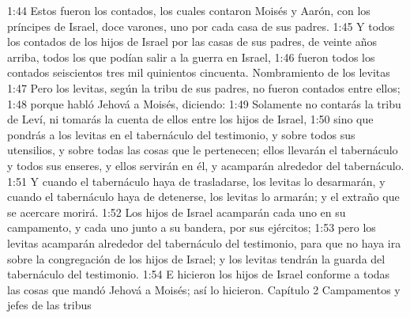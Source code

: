 1:44 Estos fueron los contados, los cuales contaron Moisés y Aarón, con los príncipes de Israel, doce varones, uno por cada casa de sus padres.  
1:45 Y todos los contados de los hijos de Israel por las casas de sus padres, de veinte años arriba, todos los que podían salir a la guerra en Israel,  
1:46 fueron todos los contados seiscientos tres mil quinientos cincuenta.  
Nombramiento de los levitas  
1:47 Pero los levitas, según la tribu de sus padres, no fueron contados entre ellos;  
1:48 porque habló Jehová a Moisés, diciendo:  
1:49 Solamente no contarás la tribu de Leví, ni tomarás la cuenta de ellos entre los hijos de Israel,  
1:50 sino que pondrás a los levitas en el tabernáculo del testimonio, y sobre todos sus utensilios, y sobre todas las cosas que le pertenecen; ellos llevarán el tabernáculo y todos sus enseres, y ellos servirán en él, y acamparán alrededor del tabernáculo.  
1:51 Y cuando el tabernáculo haya de trasladarse, los levitas lo desarmarán, y cuando el tabernáculo haya de detenerse, los levitas lo armarán; y el extraño que se acercare morirá.  
1:52 Los hijos de Israel acamparán cada uno en su campamento, y cada uno junto a su bandera, por sus ejércitos;  
1:53 pero los levitas acamparán alrededor del tabernáculo del testimonio, para que no haya ira sobre la congregación de los hijos de Israel; y los levitas tendrán la guarda del tabernáculo del testimonio.  
1:54 E hicieron los hijos de Israel conforme a todas las cosas que mandó Jehová a Moisés; así lo hicieron.  
Capítulo 2 
Campamentos y jefes de las tribus  

